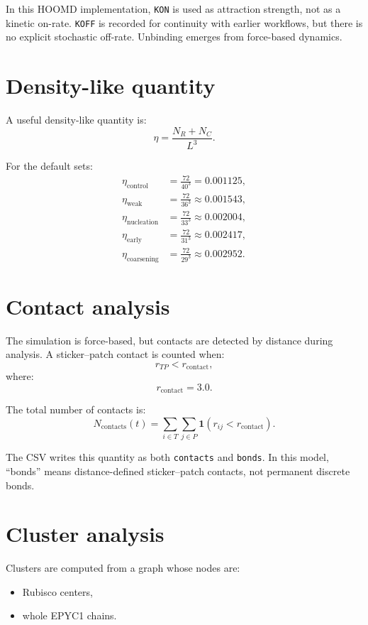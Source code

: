 \documentclass[11pt]{article}
\begin{document}
In this HOOMD implementation, \texttt{KON} is used as attraction strength, not as a kinetic on-rate. \texttt{KOFF} is recorded for continuity with earlier workflows, but there is no explicit stochastic off-rate. Unbinding emerges from force-based dynamics.

\section{Density-like quantity}

A useful density-like quantity is:
\[
\eta = \frac{N_R+N_C}{L^3}.
\]

For the default sets:
\begin{align*}
\eta_{\mathrm{control}} &= \frac{72}{40^3} = 0.001125,\\
\eta_{\mathrm{weak}} &= \frac{72}{36^3} \approx 0.001543,\\
\eta_{\mathrm{nucleation}} &= \frac{72}{33^3} \approx 0.002004,\\
\eta_{\mathrm{early}} &= \frac{72}{31^3} \approx 0.002417,\\
\eta_{\mathrm{coarsening}} &= \frac{72}{29^3} \approx 0.002952.
\end{align*}

\section{Contact analysis}

The simulation is force-based, but contacts are detected by distance during analysis. A sticker--patch contact is counted when:
\[
r_{TP} < r_{\mathrm{contact}},
\]
where:
\[
r_{\mathrm{contact}} = 3.0.
\]

The total number of contacts is:
\[
N_{\mathrm{contacts}}(t)
=
\sum_{i\in T}\sum_{j\in P}
\mathbf{1}\left(r_{ij}<r_{\mathrm{contact}}\right).
\]

The CSV writes this quantity as both \texttt{contacts} and \texttt{bonds}. In this model, ``bonds'' means distance-defined sticker--patch contacts, not permanent discrete bonds.

\section{Cluster analysis}

Clusters are computed from a graph whose nodes are:
\begin{itemize}
    \item Rubisco centers,
    \item whole EPYC1 chains.
\end{itemize}
\end{document}

